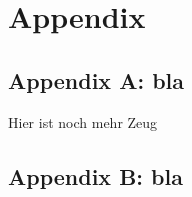 \chapter*{Appendix}
\label{chapter:Appendix}
\pagestyle{Appendix}

\section*{Appendix A: bla}
\label{Anh:bla1}

Hier ist noch mehr Zeug

\section*{Appendix B: bla}
\label{Anh:bla2}